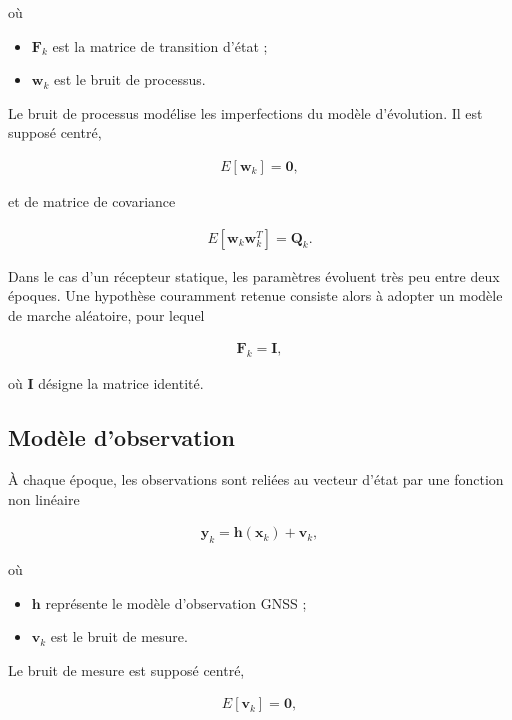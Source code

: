 où

\begin{itemize}
\item $\mathbf{F}_k$ est la matrice de transition d'état ;
\item $\mathbf{w}_k$ est le bruit de processus.
\end{itemize}

Le bruit de processus modélise les imperfections du modèle d'évolution. Il est supposé centré,

\begin{align}
E[\mathbf{w}_k]=\mathbf{0},
\end{align}

et de matrice de covariance

\begin{align}
E[\mathbf{w}_k\mathbf{w}_k^T]
=
\mathbf{Q}_k.
\end{align}

Dans le cas d'un récepteur statique, les paramètres évoluent très peu entre deux époques. Une hypothèse couramment retenue consiste alors à adopter un modèle de marche aléatoire, pour lequel

\begin{align}
\mathbf{F}_k=\mathbf{I},
\end{align}

où $\mathbf{I}$ désigne la matrice identité.

\subsection{Modèle d'observation}

À chaque époque, les observations sont reliées au vecteur d'état par une fonction non linéaire

\begin{align}
\mathbf{y}_k
=
\mathbf{h}(\mathbf{x}_k)
+
\mathbf{v}_k,
\label{eq:kalman_observation}
\end{align}

où

\begin{itemize}
\item $\mathbf{h}$ représente le modèle d'observation GNSS ;
\item $\mathbf{v}_k$ est le bruit de mesure.
\end{itemize}

Le bruit de mesure est supposé centré,

\begin{align}
E[\mathbf{v}_k]=\mathbf{0},
\end{align}

